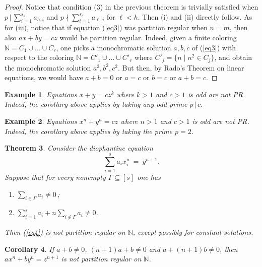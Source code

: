 \documentclass[11pt]{amsart}
\newtheorem{theorem}{Theorem}[section]
\newtheorem{corollary}[theorem]{Corollary}
\theoremstyle{definition}
\newtheorem{example}[theorem]{Example}
\theoremstyle{remark}
\numberwithin{equation}{section}
\begin{document}
\begin{proof}
Notice that condition (3) in the previous theorem
is trivially satisfied when $p{\,|\,}\sum_{i=1}^{s_h} a_{h,i}$ and 
$p{\nmid}\sum_{i=1}^{s_\ell}a_{\ell,i}$ for $\ell<h$.
Then (i) and (ii) directly follow.
As for (iii), notice that if equation (\ref{eq3}) was partition regular
when $n=m$, then also $ax+by=cz$ would be
partition regular. Indeed, given a finite coloring
${\mathbb{N}}=C_1\cup\ldots\cup C_r$, one picks a
monochromatic solution $a,b,c$ of (\ref{eq3})
with respect to the coloring ${\mathbb{N}}=C'_1\cup\ldots\cup C'_r$ where
$C'_j=\{n\mid n^2\in C_j\}$, and obtain the
monochromatic solution $a^2,b^2,c^2$.
But then, by Rado's Theorem on linear equations,
we would have $a+b=0$ or $a=c$ or $b=c$ or $a+b=c$.
\end{proof}

\begin{example}
\emph{Equations $x+y=cz^k$ where $k>1$ and 
$c>1$ is odd are not PR. Indeed, the corollary above applies by taking 
any odd prime $p{\,|\,} c$.}
\end{example}

\begin{example}
\emph{Equations $x^n+y^n=cz$ where $n>1$ and $c>1$ is odd
are not PR. Indeed, the corollary above applies by taking 
the prime $p=2$.}
\end{example}

\smallskip
\begin{theorem}\label{main3}
Consider the diophantine equation
\begin{equation}\label{eq4}
\sum_{i=1}^{s}a_i x_i^n\ =\ y^{n+1}.
\end{equation}
Suppose that for every nonempty $\Gamma\subseteq[s]$ one has

\smallskip
\begin{enumerate}
\item
$\sum_{i\in\Gamma}a_i\ne 0$\,; 

\smallskip
\item
$\sum_{i=1}^s a_i+n\sum_{i\notin\Gamma}a_i\ne 0$.
\end{enumerate}

\smallskip
Then (\ref{eq4}) is not partition regular on ${\mathbb{N}}$,
except possibly for constant solutions.
\end{theorem}

\begin{corollary}\label{cor2}
If $a+b\ne 0$, $(n+1)a+b\ne 0$ and $a+(n+1)b\ne 0$,
then $a x^n+b y^n=z^{n+1}$
is not partition regular on ${\mathbb{N}}$.
\end{corollary}
\end{document}
